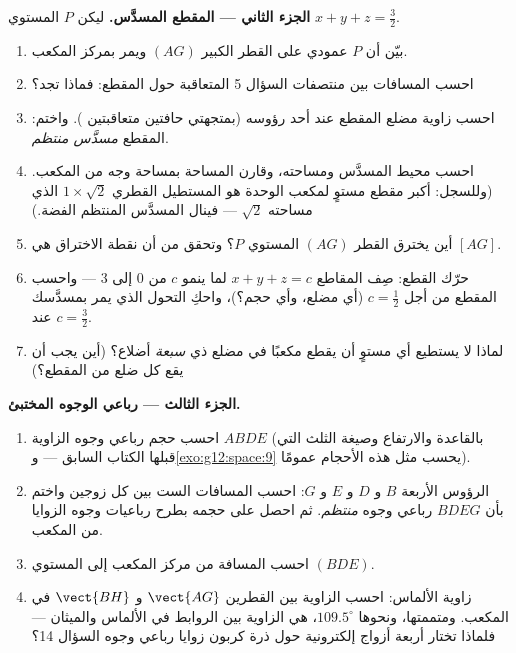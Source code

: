 \begin{problem}
\medskip
\noindent\textbf{الجزء الثاني --- المقطع المسدَّس.}
ليكن $P$ المستوي $x + y + z = \frac32$.
\begin{enumerate}[resume]
  \item بيّن أن $P$ عمودي على القطر الكبير
        $(AG)$ ويمر بمركز المكعب.
  \item احسب المسافات بين منتصفات السؤال 5 المتعاقبة
        حول المقطع: فماذا تجد؟
  \item احسب زاوية مضلع المقطع عند أحد
        رؤوسه (بمتجهتي حافتين متعاقبتين ). واختم: المقطع \emph{مسدَّس
        منتظم}.
  \item احسب محيط المسدَّس ومساحته، وقارن
        المساحة بمساحة وجه من المكعب. (وللسجل: أكبر مقطع
        مستوٍ لمكعب الوحدة هو المستطيل القطري $1 \times \sqrt2$
        الذي مساحته $\sqrt2$ --- فينال المسدَّس المنتظم الفضة.)
  \item أين يخترق القطر $(AG)$ المستوي $P$؟ وتحقق من أن
        نقطة الاختراق هي  $[AG]$.
  \item حرّك القطع: صِف المقاطع
        $x + y + z = c$ لما ينمو $c$ من $0$ إلى $3$ ---
        واحسب المقطع من أجل $c = \frac12$ (أي مضلع،
        وأي حجم؟)، واحكِ التحول الذي يمر
        بمسدَّسك عند $c = \frac32$.
  \item لماذا لا يستطيع أي مستوٍ أن يقطع مكعبًا في مضلع ذي
        \emph{سبعة} أضلاع؟ (أين يجب أن يقع كل ضلع من
        المقطع؟)
\end{enumerate}

\medskip
\noindent\textbf{الجزء الثالث --- رباعي الوجوه المختبئ.}
\begin{enumerate}[resume]
  \item احسب حجم رباعي وجوه الزاوية $ABDE$
        (بالقاعدة والارتفاع وصيغة الثلث التي قبلها الكتاب
        السابق --- و\cref{exo:g12:space:9}
        يحسب مثل هذه الأحجام عمومًا).
  \item الرؤوس الأربعة $B$ و $D$ و $E$ و $G$: احسب المسافات
        الست بين كل زوجين واختم بأن $BDEG$ رباعي وجوه
        \emph{منتظم}. ثم احصل على حجمه بطرح
        رباعيات وجوه الزوايا من المكعب.
  \item احسب المسافة من مركز المكعب إلى
        المستوي $(BDE)$.
  \item زاوية الألماس: احسب الزاوية بين
        القطرين $\vect{AG}$ و $\vect{BH}$ في المكعب. ومتممتها، ونحوها $109.5^\circ$، هي الزاوية بين
        الروابط في الألماس والميثان --- فلماذا تختار أربعة
        أزواج إلكترونية حول ذرة كربون زوايا
        رباعي وجوه السؤال 14؟
\end{enumerate}


\end{problem}
